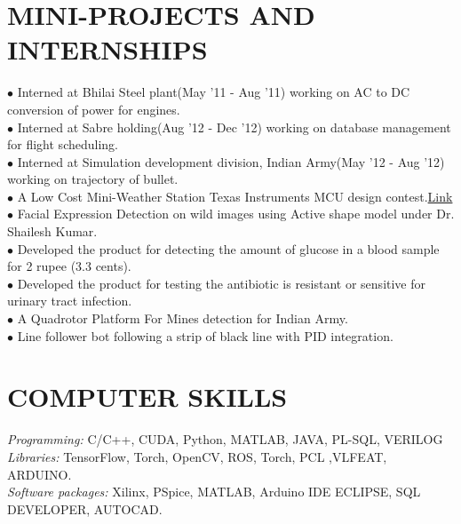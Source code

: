 \documentclass[a4paper,10pt]{article}
\begin{document}
\section{MINI-PROJECTS AND INTERNSHIPS} 
$\bullet$ Interned at Bhilai Steel plant(May '11 - Aug '11) working on AC to DC conversion of power for engines.\\
$\bullet$ Interned at Sabre holding(Aug '12 - Dec '12) working on database management for flight scheduling.\\
$\bullet$ Interned at Simulation development division, Indian Army(May '12 - Aug '12) working on trajectory of bullet.\\
$\bullet$ A Low Cost Mini-Weather Station Texas Instruments MCU design contest.\href{http://www.youtube.com/watch?v=kyFDzlU89iE}{Link} \\
$\bullet$ Facial Expression Detection on wild images using Active shape model under Dr. Shailesh Kumar. \\
$\bullet$ Developed the product for detecting the amount of glucose in a blood sample for 2 rupee (3.3 cents). \\
$\bullet$  Developed the product for testing the antibiotic is resistant or sensitive for urinary tract infection.\\
$\bullet$ A Quadrotor Platform For Mines detection for Indian Army.\\
$\bullet$ Line follower bot following a strip of black line with PID integration.\\

\vspace{-4 mm}

\section{COMPUTER SKILLS} 
{\sl Programming:}        C/C++, CUDA, Python, MATLAB, JAVA, PL-SQL, VERILOG\\
{\sl Libraries:        }      TensorFlow, Torch, OpenCV, ROS, Torch, PCL ,VLFEAT, ARDUINO.\\
{\sl Software packages: } Xilinx, PSpice, MATLAB, Arduino IDE
                       ECLIPSE, SQL DEVELOPER, AUTOCAD.\\
 
\end{document}
